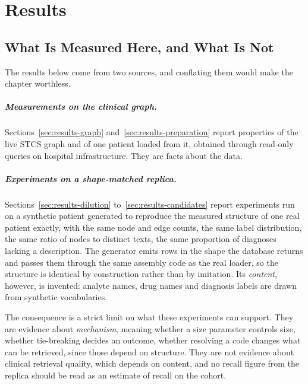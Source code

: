 \chapter{Results} \label{chapter:results}


\section{What Is Measured Here, and What Is Not} \label{sec:results-scope}

The results below come from two sources, and conflating them would make the
chapter worthless.

\paragraph{Measurements on the clinical graph.} Sections~\ref{sec:results-graph}
and~\ref{sec:results-preparation} report properties of the live STCS graph and of
one patient loaded from it, obtained through read-only queries on hospital
infrastructure. They are facts about the data.

\paragraph{Experiments on a shape-matched replica.}
Sections~\ref{sec:results-dilution} to~\ref{sec:results-candidates} report
experiments run on a synthetic patient generated to reproduce the measured
structure of one real patient exactly, with the same node and edge counts, the same
label distribution, the same ratio of nodes to distinct texts, the same
proportion of diagnoses lacking a description. The generator emits rows in the
shape the database returns and passes them through the same assembly code as the
real loader, so the structure is identical by construction rather than by
imitation. Its \emph{content}, however, is invented: analyte names, drug names
and diagnosis labels are drawn from synthetic vocabularies.

The consequence is a strict limit on what these experiments can support. They are
evidence about \emph{mechanism}, meaning whether a size parameter controls size,
whether tie-breaking decides an outcome, whether resolving a code changes what can
be retrieved, since those depend on structure. They are not evidence about
clinical retrieval quality, which depends on content, and no recall figure from
the replica should be read as an estimate of recall on the cohort.

